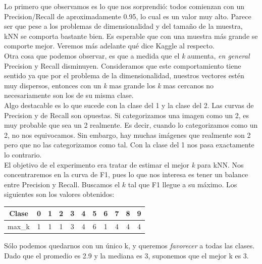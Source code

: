 Lo primero que observamos es lo que nos sorprendió: todos comienzan con un Precision/Recall de aproximadamente 0.95, lo cual es un valor muy alto. Parece ser que pese a los problemas de dimensionalidad y del tamaño de la muestra, kNN se comporta bastante bien. Es esperable que con una muestra más grande se comporte mejor. Veremos más adelante qué dice Kaggle al respecto.\\

Otra cosa que podemos observar, es que a medida que el \textit{k} aumenta, \textit{en general} Precision y Recall disminuyen. Consideramos que este comportamiento tiene sentido ya que por el problema de la dimensionalidad, nuestros vectores estén muy dispersos, entonces con un \textit{k} mas grande los \textit{k} mas cercanos no necesariamente son los de su misma clase. \\

Algo destacable es lo que sucede con la clase del 1 y la clase del 2. Las curvas de Precision y de Recall son opuestas. Si categorizamos una imagen como un 2, es muy probable que sea un 2 realmente. Es decir, cuando lo categorizamos como un 2, no nos equivocamos. Sin embargo, hay muchas imágenes que realmente son 2 pero que no las categorizamos como tal. Con la clase del 1 nos pasa exactamente lo contrario. \\

El objetivo de el experimento era tratar de estimar el mejor \textit{k} para kNN. Nos concentraremos en la curva de F1, pues lo que nos interesa es tener un balance entre Precision y Recall. Buscamos el $k$ tal que F1 llegue a su máximo. Los siguientes son los valores obtenidos: \\

\begin{center}
    \begin{tabular}{| c | c | c | c | c | c | c | c | c | c | c |}
    \hline
    Clase   & 0 & 1 & 2 & 3 & 4 & 5 & 6 & 7 & 8 & 9  \\ \hline
    max_k       & 1 & 1 & 1 & 3 & 4 & 6 & 1 & 4 & 4 & 4  \\ \hline
    \end{tabular}
\end{center}

Sólo podemos quedarnos con un único k, y queremos \textit{favorecer} a todas las clases. Dado que el promedio es 2.9 y la mediana es 3, suponemos que el mejor k es 3.



\newpage


